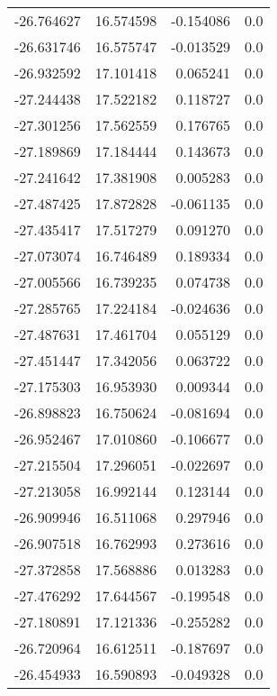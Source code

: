 \begin{tabular}{rrrr}
      -26.764627 &        16.574598 &   -0.154086 &   0.0 \\
      -26.631746 &        16.575747 &   -0.013529 &   0.0 \\
      -26.932592 &        17.101418 &    0.065241 &   0.0 \\
      -27.244438 &        17.522182 &    0.118727 &   0.0 \\
      -27.301256 &        17.562559 &    0.176765 &   0.0 \\
      -27.189869 &        17.184444 &    0.143673 &   0.0 \\
      -27.241642 &        17.381908 &    0.005283 &   0.0 \\
      -27.487425 &        17.872828 &   -0.061135 &   0.0 \\
      -27.435417 &        17.517279 &    0.091270 &   0.0 \\
      -27.073074 &        16.746489 &    0.189334 &   0.0 \\
      -27.005566 &        16.739235 &    0.074738 &   0.0 \\
      -27.285765 &        17.224184 &   -0.024636 &   0.0 \\
      -27.487631 &        17.461704 &    0.055129 &   0.0 \\
      -27.451447 &        17.342056 &    0.063722 &   0.0 \\
      -27.175303 &        16.953930 &    0.009344 &   0.0 \\
      -26.898823 &        16.750624 &   -0.081694 &   0.0 \\
      -26.952467 &        17.010860 &   -0.106677 &   0.0 \\
      -27.215504 &        17.296051 &   -0.022697 &   0.0 \\
      -27.213058 &        16.992144 &    0.123144 &   0.0 \\
      -26.909946 &        16.511068 &    0.297946 &   0.0 \\
      -26.907518 &        16.762993 &    0.273616 &   0.0 \\
      -27.372858 &        17.568886 &    0.013283 &   0.0 \\
      -27.476292 &        17.644567 &   -0.199548 &   0.0 \\
      -27.180891 &        17.121336 &   -0.255282 &   0.0 \\
      -26.720964 &        16.612511 &   -0.187697 &   0.0 \\
      -26.454933 &        16.590893 &   -0.049328 &   0.0 \\

\end{tabular}
